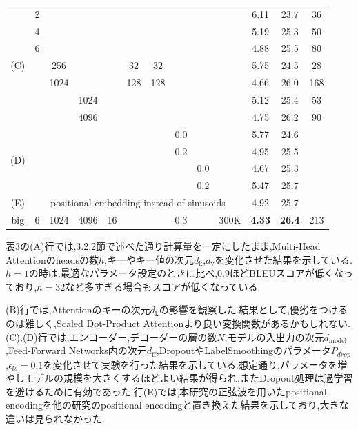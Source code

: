 \documentclass{jarticle}     %
\begin{document}
\begin{table}[htb]
\begin{tabular}{c|ccccccccc|ccc}
      \midrule
      \multirow{7}{*}{(C)} & 2 & & & & & & & & & 6.11 & 23.7 & 36        \\
                         & 4 & & & & & & & & & 5.19 & 25.3 & 50        \\
                         & 6 & & & & & & & & & 4.88 & 25.5 & 80        \\
                         & & 256 & & & 32 & 32 & & & & 5.75 & 24.5 & 28        \\
                         & & 1024 & & & 128 & 128 & & & & 4.66 & 26.0 & 168        \\
                         & & & 1024 & & & & & & & 5.12 & 25.4 & 53        \\
                         & & & 4096 & & & & & & & 4.75 & 26.2 & 90        \\
      \midrule
      \multirow{4}{*}{(D)} & & & & & & & 0.0 & & & 5.77 & 24.6 &         \\
                         & & & & & & & 0.2 & & & 4.95 & 25.5 &        \\
                         & & & & & & & & 0.0 & & 4.67 & 25.3 &        \\
                         & & & & & & & & 0.2 & & 5.47 & 25.7 &        \\
      \midrule
      (E) & \multicolumn{9}{c|}{positional embedding instead of sinusoids}& 4.92 & 25.7 &  \\
      \midrule
      big & 6 & 1024 & 4096 & 16 & & & 0.3 & & 300K & \textbf{4.33} & \textbf{26.4} & 213 \\


      \bottomrule
  \end{tabular}
\end{table}

表3の(A)行では,3.2.2節で述べた通り計算量を一定にしたまま,Multi-Head Attentionのheadsの数$h$,キーやキー値の次元$d_\mathrm{k}$,$d_\mathrm{v}$を変化させた結果を示している.$h=1$の時は,最適なパラメータ設定のときに比べ,0.9ほどBLEUスコアが低くなっており,$h=32$など多すぎる場合もスコアが低くなっている.\par
(B)行では,Attentionのキーの次元$d_\mathrm{k}$の影響を観察した.結果として,優劣をつけるのは難しく,Scaled Dot-Product Attentionより良い変換関数があるかもしれない.(C),(D)行では,エンコーダー,デコーダーの層の数$N$,モデルの入出力の次元$d_\mathrm{model}$,Feed-Forward Networks内の次元$d_\mathrm{ff}$,DropoutやLabelSmoothingのパラメータ$P_{drop}$,$\epsilon_{ls} = 0.1$を変化させて実験を行った結果を示している.想定通り,パラメータを増やしモデルの規模を大きくするほどよい結果が得られ,またDropout処理は過学習を避けるために有効であった.行(E)では,本研究の正弦波を用いたpositional encodingを他の研究のpositional encodingと置き換えた結果を示しており,大きな違いは見られなかった.
\end{document}
